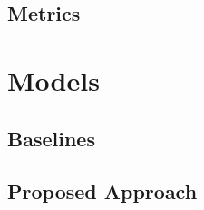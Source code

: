 \documentclass[11pt,a4paper]{article}
\begin{document}



\subsection{Metrics}


\section{Models}

\subsection{Baselines}


\subsection{Proposed Approach} \label{section:proposed-approach}


% 
\end{document}
